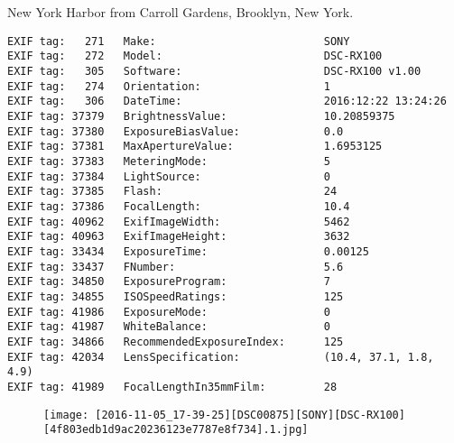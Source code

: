 \section{\protect{}}
\noindent New York Harbor from Carroll Gardens, Brooklyn, New York.
\noindent
\begin{lstlisting}
EXIF tag:   271   Make:                          SONY
EXIF tag:   272   Model:                         DSC-RX100
EXIF tag:   305   Software:                      DSC-RX100 v1.00
EXIF tag:   274   Orientation:                   1
EXIF tag:   306   DateTime:                      2016:12:22 13:24:26
EXIF tag: 37379   BrightnessValue:               10.20859375
EXIF tag: 37380   ExposureBiasValue:             0.0
EXIF tag: 37381   MaxApertureValue:              1.6953125
EXIF tag: 37383   MeteringMode:                  5
EXIF tag: 37384   LightSource:                   0
EXIF tag: 37385   Flash:                         24
EXIF tag: 37386   FocalLength:                   10.4
EXIF tag: 40962   ExifImageWidth:                5462
EXIF tag: 40963   ExifImageHeight:               3632
EXIF tag: 33434   ExposureTime:                  0.00125
EXIF tag: 33437   FNumber:                       5.6
EXIF tag: 34850   ExposureProgram:               7
EXIF tag: 34855   ISOSpeedRatings:               125
EXIF tag: 41986   ExposureMode:                  0
EXIF tag: 41987   WhiteBalance:                  0
EXIF tag: 34866   RecommendedExposureIndex:      125
EXIF tag: 42034   LensSpecification:             (10.4, 37.1, 1.8, 4.9)
EXIF tag: 41989   FocalLengthIn35mmFilm:         28

\end{lstlisting}
\clearpage
\begin{figure}
\raggedleft
\texttt{[image: [2016-11-05\_17-39-25][DSC00875][SONY][DSC-RX100][4f803edb1d9ac20236123e7787e8f734].1.jpg]}
\end{figure}


\clearpage
